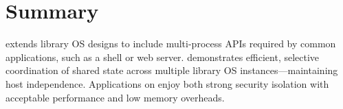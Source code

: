 \section{Summary}
\label{sec:graphene:summary}

\sysname{} extends library OS designs 
to include multi-process APIs required by common applications, such as a shell or 
web server.
\sysname{} demonstrates efficient, selective
coordination of shared state across multiple library OS 
instances---maintaining host independence.
Applications on \sysname{} enjoy both 
strong security isolation with acceptable performance and low memory overheads.




